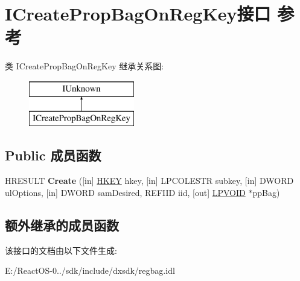 \hypertarget{interface_i_create_prop_bag_on_reg_key}{}\section{I\+Create\+Prop\+Bag\+On\+Reg\+Key接口 参考}
\label{interface_i_create_prop_bag_on_reg_key}
类 I\+Create\+Prop\+Bag\+On\+Reg\+Key 继承关系图\+:\begin{figure}[H]
\begin{center}
\leavevmode
\includegraphics[height=2.000000cm]{interface_i_create_prop_bag_on_reg_key}
\end{center}
\end{figure}
\subsection*{Public 成员函数}
\begin{DoxyCompactItemize}
\item 
\mbox{\label{interface_i_create_prop_bag_on_reg_key_a6c64bb0c5e07e8bc8346b93271543fa5}} 
H\+R\+E\+S\+U\+LT {\bfseries Create} (\mbox{[}in\mbox{]} \hyperlink{interfacevoid}{H\+K\+EY} hkey, \mbox{[}in\mbox{]} L\+P\+C\+O\+L\+E\+S\+TR subkey, \mbox{[}in\mbox{]} D\+W\+O\+RD ul\+Options, \mbox{[}in\mbox{]} D\+W\+O\+RD sam\+Desired, R\+E\+F\+I\+ID iid, \mbox{[}out\mbox{]} \hyperlink{interfacevoid}{L\+P\+V\+O\+ID} $\ast$pp\+Bag)
\end{DoxyCompactItemize}
\subsection*{额外继承的成员函数}


该接口的文档由以下文件生成\+:\begin{DoxyCompactItemize}
\item 
E\+:/\+React\+O\+S-\/0../sdk/include/dxsdk/regbag.\+idl\end{DoxyCompactItemize}

